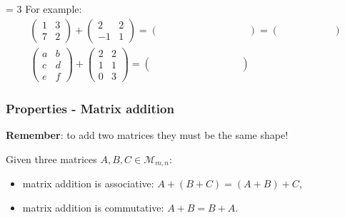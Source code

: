 \documentclass[usenames,dvipsnames,aspectratio=169,10pt]{beamer}
\def \EXAMPLEVERSION {3} %
\numberwithin{equation}{section}
\begin{document}
\begin{frame}
\ifnum \EXAMPLEVERSION = 3 {
For example:
\begin{gather*}
\begin{pmatrix}
 1 & 3 \\
 7 & 2 
\end{pmatrix}
+
\begin{pmatrix}
 2 & 2 \\
-1 & 1 
\end{pmatrix}
=
\begin{pmatrix}
 \quad & \quad & \quad & \quad & \quad \\
 \quad & \quad & \quad & \quad & \quad
\end{pmatrix}
=
\begin{pmatrix}
 \quad & \quad & \quad \\
 \quad & \quad & \quad
\end{pmatrix}
\\
\begin{pmatrix}
 a & b \\
 c & d \\
 e & f 
\end{pmatrix}
+
\begin{pmatrix}
 2 & 2 \\
 1 & 1 \\
 0 & 3  
\end{pmatrix}
=
\begin{pmatrix}
 \quad & \quad & \quad & \quad & \quad \\
 \quad & \quad & \quad & \quad & \quad \\
 \quad & \quad & \quad & \quad & \quad
\end{pmatrix}
\end{gather*}
}
\fi 

\end{frame}





\begin{frame}
\frametitle{Properties - Matrix addition}

\textbf{Remember}: to add two matrices they must be the same shape!

Given three matrices $A,B,C \in \mathcal{M}_{m,n}$:
\begin{itemize}
\item matrix addition is associative: $A + (B+C) = (A+B) + C$,

\item matrix addition is commutative: $A +B = B + A$.
\end{itemize}

\end{frame}
\end{document}
